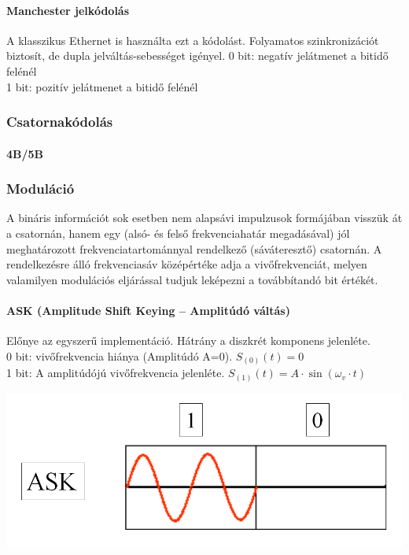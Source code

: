 \paragraph{Manchester jelkódolás} A klasszikus Ethernet is használta ezt a kódolást. Folyamatos szinkronizációt biztosít, de dupla jelváltás-sebességet igényel.
0 bit: negatív jelátmenet a bitidő felénél\\
1 bit: pozitív jelátmenet a bitidő felénél\\

\subsubsection{Csatornakódolás}

\paragraph{4B/5B}

\subsubsection{Moduláció}
A bináris információt sok esetben nem alapsávi impulzusok formájában visszük át a csatornán, hanem egy (alsó- és felső frekvenciahatár megadásával) jól meghatározott frekvenciatartománnyal rendelkező (sáváteresztő) csatornán. A rendelkezésre álló frekvenciasáv középértéke adja a vivőfrekvenciát, melyen valamilyen modulációs eljárással tudjuk leképezni a továbbítandó bit értékét.

\paragraph{ASK (Amplitude Shift Keying -- Amplitúdó váltás)} Előnye az egyszerű implementáció. Hátrány a diszkrét komponens jelenléte.\\
0 bit: vivőfrekvencia hiánya (Amplitúdó A=0). $S_{(0)}(t) = 0$\\
1 bit: A amplitúdójú vivőfrekvencia jelenléte. $S_{(1)}(t) = A\cdot\sin(\omega_v\cdot t) $\\
\begin{center}
	\includegraphics[width=0.25\linewidth]{fig/12-ASK}
\end{center}

